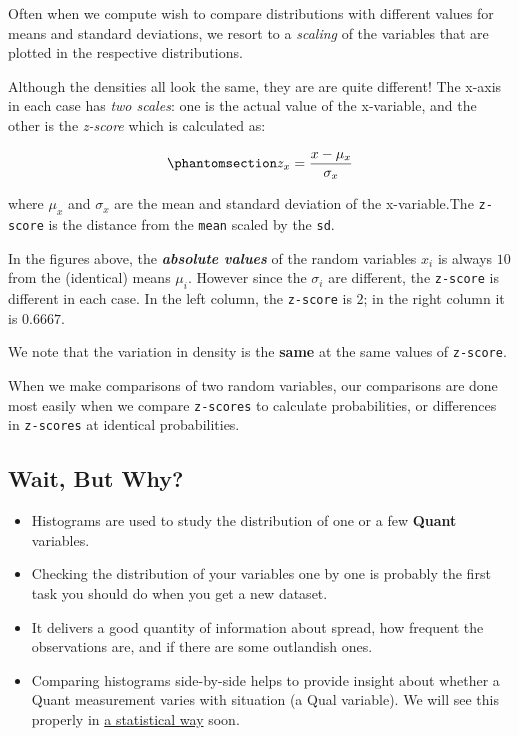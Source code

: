 \documentclass[
  letterpaper,
  DIV=11,
  numbers=noendperiod,
  oneside]{scrartcl}
\providecommand{\tightlist}{%
  \setlength{\itemsep}{0pt}\setlength{\parskip}{0pt}}
\begin{document}
Often when we compute wish to compare distributions with different
values for means and standard deviations, we resort to a \emph{scaling}
of the variables that are plotted in the respective distributions.

Although the densities all look the same, they are are quite different!
The x-axis in each case has \emph{two scales}: one is the actual value
of the x-variable, and the other is the \emph{z-score} which is
calculated as:

\begin{equation}\phantomsection\label{eq-zcores}{
z_x = \frac{x - \mu_{x}}{\sigma_x}
}\end{equation}

where \(\mu_x\) and \(\sigma_x\) are the mean and standard deviation of
the x-variable.{The \texttt{z-score} is the distance from the
\texttt{mean} scaled by the \texttt{sd}}.

In the figures above, the \textbf{\emph{absolute values}} of the random
variables \(x_i\) is always \(10\) from the (identical) means \(\mu_i\).
However since the \(\sigma_i\) are different, the \texttt{z-score} is
different in each case. In the left column, the \texttt{z-score} is
\(2\); in the right column it is \(0.6667\).

We note that the variation in density is the \textbf{same} at the same
values of \texttt{z-score}.

When we make comparisons of two random variables, our comparisons are
done most easily when we compare \texttt{z-scores} to calculate
probabilities, or differences in \texttt{z-scores} at identical
probabilities.

\subsection{\texorpdfstring{ Wait, But
Why?}{ Wait, But Why?}}\label{wait-but-why}

\begin{itemize}
\tightlist
\item
  Histograms are used to study the distribution of one or a few
  \textbf{Quant} variables.\\
\item
  Checking the distribution of your variables one by one is probably the
  first task you should do when you get a new dataset.\\
\item
  It delivers a good quantity of information about spread, how frequent
  the observations are, and if there are some outlandish ones.\\
\item
  Comparing histograms side-by-side helps to provide insight about
  whether a Quant measurement varies with situation (a Qual variable).
  We will see this properly in
  \href{../../../20-Inference/Modules/110-TwoMeans/index.qmd}{a
  statistical way} soon.
\end{itemize}
\end{document}
